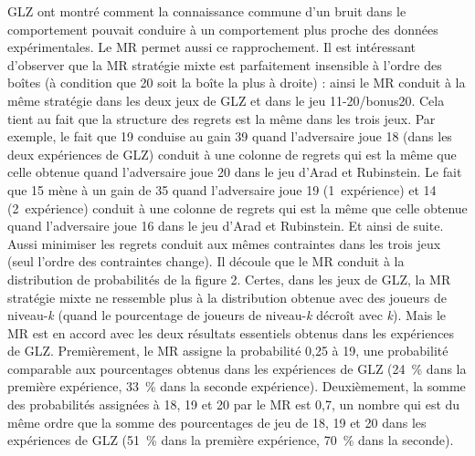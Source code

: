 \begin{Article}
\begin{refsection}[UmbhauerFR]
GLZ ont montré comment la connaissance commune d'un bruit dans le
comportement pouvait conduire à un comportement plus proche des données
expérimentales. Le MR permet aussi ce rapprochement. Il est intéressant
d'observer que la MR stratégie mixte est parfaitement insensible à
l'ordre des boîtes (à condition que 20 soit la boîte la plus à droite) :
ainsi le MR conduit à la même stratégie dans les deux jeux de GLZ et
dans le jeu 11-20/bonus20. Cela tient au fait que la structure des
regrets est la même dans les trois jeux. Par exemple, le fait que 19
conduise au gain 39 quand l'adversaire joue 18 (dans les deux
expériences de GLZ) conduit à une colonne de regrets qui est la même que
celle obtenue quand l'adversaire joue 20 dans le jeu d'Arad et
Rubinstein. Le fait que 15 mène à un gain de 35 quand l'adversaire joue
19 (1\iere{}~expérience) et 14 (2\ieme{}~expérience) conduit à une colonne de regrets qui est la même que celle
obtenue quand l'adversaire joue 16 dans le jeu d'Arad et Rubinstein. Et
ainsi de suite. Aussi minimiser les regrets conduit aux mêmes
contraintes dans les trois jeux (seul l'ordre des contraintes change).
Il découle que le MR conduit à la distribution de probabilités de la
figure 2. Certes, dans les jeux de GLZ, la MR stratégie mixte ne
ressemble plus à la distribution obtenue avec des joueurs de
niveau-\emph{k} (quand le pourcentage de joueurs de niveau-\emph{k}
décroît avec \emph{k}). Mais le MR est en accord avec les deux résultats
essentiels obtenus dans les expériences de GLZ. Premièrement, le MR
assigne la probabilité 0,25 à 19, une probabilité comparable aux
pourcentages obtenus dans les expériences de GLZ (24~\% dans la première
expérience, 33~\% dans la seconde expérience). Deuxièmement, la somme des
probabilités assignées à 18, 19 et 20 par le MR est 0,7, un nombre qui
est du même ordre que la somme des pourcentages de jeu de 18, 19 et 20
dans les expériences de GLZ (51~\% dans la première expérience, 70~\% dans
la seconde).


\end{refsection}
\end{Article}
